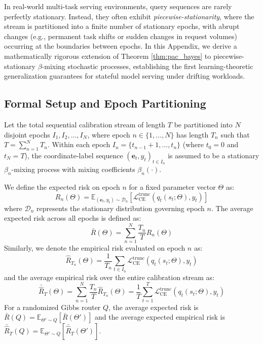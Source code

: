 In real-world multi-task serving environments, query sequences are rarely perfectly stationary. Instead, they often exhibit \emph{piecewise-stationarity}, where the stream is partitioned into a finite number of stationary epochs, with abrupt changes (e.g., permanent task shifts or sudden changes in request volumes) occurring at the boundaries between epochs. In this Appendix, we derive a mathematically rigorous extension of Theorem \ref{thm:pac_bayes} to piecewise-stationary $\beta$-mixing stochastic processes, establishing the first learning-theoretic generalization guarantees for stateful model serving under drifting workloads.

\subsection{Formal Setup and Epoch Partitioning}
Let the total sequential calibration stream of length $T$ be partitioned into $N$ disjoint epochs $I_1, I_2, \dots, I_N$, where epoch $n \in \{1, \dots, N\}$ has length $T_n$ such that $T = \sum_{n=1}^N T_n$. Within each epoch $I_n = \{t_{n-1} + 1, \dots, t_n\}$ (where $t_0 = 0$ and $t_N = T$), the coordinate-label sequence $(\mathbf{e}_t, y_t)_{t \in I_n}$ is assumed to be a stationary $\beta_n$-mixing process with mixing coefficients $\beta_n(\cdot)$.

We define the expected risk on epoch $n$ for a fixed parameter vector $\Theta$ as:
\begin{equation}
    R_n(\Theta) = \mathbb{E}_{(\mathbf{e}_t, y_t) \sim \mathcal{D}_n} \left[ \mathcal{L}_{\text{CE}}^{\text{trunc}}(q_t(s_t; \Theta), y_t) \right]
\end{equation}
where $\mathcal{D}_n$ represents the stationary distribution governing epoch $n$. The average expected risk across all epochs is defined as:
\begin{equation}
    \bar{R}(\Theta) = \sum_{n=1}^N \frac{T_n}{T} R_n(\Theta)
\end{equation}
Similarly, we denote the empirical risk evaluated on epoch $n$ as:
\begin{equation}
    \hat{R}_{T_n}(\Theta) = \frac{1}{T_n} \sum_{t \in I_n} \mathcal{L}_{\text{CE}}^{\text{trunc}}(q_t(s_t; \Theta), y_t)
\end{equation}
and the average empirical risk over the entire calibration stream as:
\begin{equation}
    \bar{\hat{R}}_T(\Theta) = \sum_{n=1}^N \frac{T_n}{T} \hat{R}_{T_n}(\Theta) = \frac{1}{T} \sum_{t=1}^T \mathcal{L}_{\text{CE}}^{\text{trunc}}(q_t(s_t; \Theta), y_t)
\end{equation}
For a randomized Gibbs router $Q$, the average expected risk is $\bar{R}(Q) = \mathbb{E}_{\Theta' \sim Q}[\bar{R}(\Theta')]$ and the average expected empirical risk is $\bar{\hat{R}}_T(Q) = \mathbb{E}_{\Theta' \sim Q}[\bar{\hat{R}}_T(\Theta')]$.

